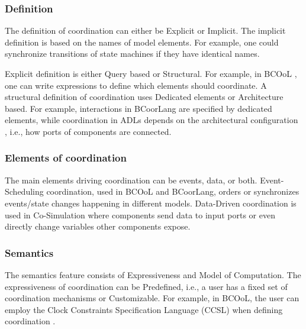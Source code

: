 \documentclass[runningheads]{llncs}
\begin{document}
\subsubsection{Definition} The definition of coordination can either be \textsf{Explicit} or \textsf{Implicit}.
The implicit definition is based on the names of model elements.
For example, one could synchronize transitions of state machines if they have identical names.

Explicit definition is either \textsf{Query based} or \textsf{Structural}.
For example, in BCOoL \cite{varalarsenBCOolBehavioralCoordination2016,varalarsenBehavioralCoordinationOperator2015}, one can write expressions to define which elements should coordinate.
A structural definition of coordination uses \textsf{Dedicated elements} or \textsf{Architecture based}.
For example, interactions in BCoorLang are specified by dedicated elements, while coordination in ADLs depends on the architectural configuration \cite{medvidovicClassificationComparisonFramework2000}, i.e., how ports of components are connected.

\subsubsection{Elements of coordination} The main elements driving coordination can be events, data, or both.
\textsf{Event-Scheduling coordination}, used in BCOoL and BCoorLang, orders or synchronizes events/state changes happening in different models.
\textsf{Data-Driven coordination} is used in Co-Simulation where components send data to input ports or even directly change variables other components expose.

\subsubsection{Semantics} The semantics feature consists of \textsf{Expressiveness} and \textsf{Model of Computation}.
The expressiveness of coordination can be \textsf{Predefined}, i.e., a user has a fixed set of coordination mechanisms or \textsf{Customizable}.
For example, in BCOoL, the user can employ the Clock Constraints Specification Language (CCSL) \cite{andreSyntaxSemanticsClock2009} when defining coordination \cite{varalarsenBCOolBehavioralCoordination2016,varalarsenBehavioralCoordinationOperator2015}.
\end{document}
